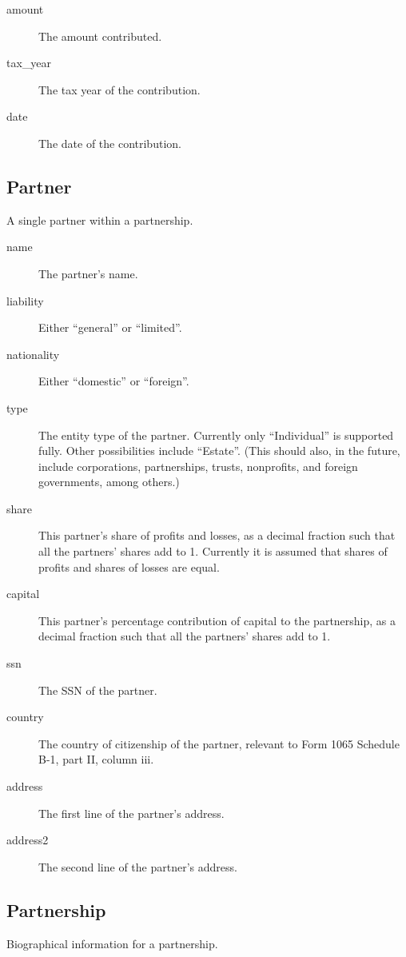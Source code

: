 \documentclass[12pt]{article}
\begin{document}
\begin{description}
\item[amount] The amount contributed.
\item[tax\_year] The tax year of the contribution.
\item[date] The date of the contribution.
\end{description}


\subsection{Partner}

A single partner within a partnership.

\begin{description}
\item[name] The partner's name.
\item[liability] Either ``general'' or ``limited''.
\item[nationality] Either ``domestic'' or ``foreign''.
\item[type] The entity type of the partner. Currently only ``Individual'' is
supported fully. Other possibilities include ``Estate''. (This should also, in
the future, include corporations, partnerships, trusts, nonprofits, and foreign
governments, among others.)
\item[share] This partner's share of profits and losses, as a decimal fraction
such that all the partners' shares add to 1. Currently it is assumed that shares
of profits and shares of losses are equal.
\item[capital] This partner's percentage contribution of capital to the
partnership, as a decimal fraction such that all the partners' shares add to 1.
\item[ssn] The SSN of the partner.
\item[country] The country of citizenship of the partner, relevant to Form 1065
Schedule B-1, part II, column iii.
\item[address] The first line of the partner's address.
\item[address2] The second line of the partner's address.
\end{description}




\subsection{Partnership}

Biographical information for a partnership.
\end{document}
